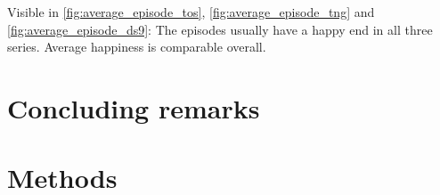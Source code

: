 Visible in \ref{fig:average_episode_tos}, \ref{fig:average_episode_tng} and \ref{fig:average_episode_ds9}: The episodes usually have a happy end in all three series. Average happiness is comparable overall.

\section{Concluding remarks}
\label{sec:papertag.concludingremarks}


\section{Methods}
\label{sec:papertag.methods}

